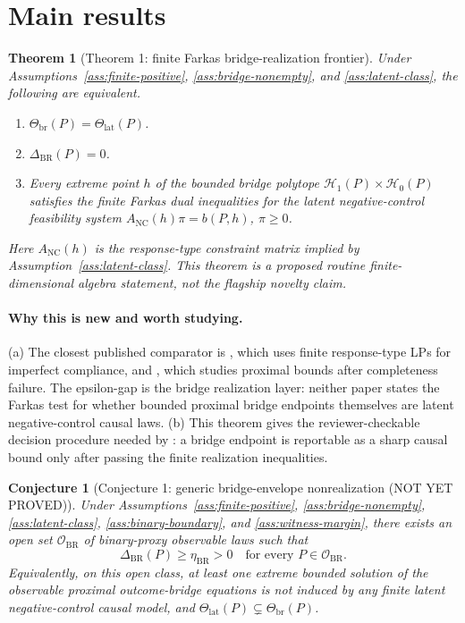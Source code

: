 \documentclass[11pt]{article}
\theoremstyle{definition}
\theoremstyle{plain}
\newtheorem{theorem}{Theorem}
\newtheorem{conjecture}{Conjecture}
\theoremstyle{remark}
\begin{document}
\section{Main results}
\begin{theorem}[Theorem 1: finite Farkas bridge-realization frontier]\label{thm:farkas-frontier}
Under Assumptions~\ref{ass:finite-positive}, \ref{ass:bridge-nonempty}, and
\ref{ass:latent-class}, the following are equivalent.
\begin{enumerate}[label=(\roman*)]
\item \(\Theta_{\mathrm{br}}(P)=\Theta_{\mathrm{lat}}(P)\).
\item \(\Delta_{\mathrm{BR}}(P)=0\).
\item Every extreme point \(h\) of the bounded bridge polytope
\(\mathcal H_1(P)\times\mathcal H_0(P)\) satisfies the finite Farkas dual
inequalities for the latent negative-control feasibility system
\(A_{\mathrm{NC}}(h)\pi=b(P,h)\), \(\pi\ge 0\).
\end{enumerate}
Here \(A_{\mathrm{NC}}(h)\) is the response-type constraint matrix implied by
Assumption~\ref{ass:latent-class}.  This theorem is a proposed routine
finite-dimensional algebra statement, not the flagship novelty claim.
\end{theorem}
\paragraph{Why this is new and worth studying.}
(a) The closest published comparator is \citet{BalkePearl1997}, which uses
finite response-type LPs for imperfect compliance, and
\citet[abstract and Sections 3--4]{GhassamiShpitserTchetgen2023}, which studies
proximal bounds after completeness failure.  The epsilon-gap is the bridge
realization layer: neither paper states the Farkas test for whether bounded
proximal bridge endpoints themselves are latent negative-control causal laws.
(b) This theorem gives the reviewer-checkable decision procedure needed by
\citet{GhassamiShpitserTchetgen2023}: a bridge endpoint is reportable as a
sharp causal bound only after passing the finite realization inequalities.

\begin{conjecture}[Conjecture 1: generic bridge-envelope nonrealization (NOT YET PROVED)]\label{conj:generic-nonrealization}
Under Assumptions~\ref{ass:finite-positive}, \ref{ass:bridge-nonempty},
\ref{ass:latent-class}, \ref{ass:binary-boundary}, and
\ref{ass:witness-margin}, there exists an open set \(\mathcal O_{\mathrm{BR}}\)
of binary-proxy observable laws such that
\[
  \Delta_{\mathrm{BR}}(P)\ge \eta_{\mathrm{BR}}>0
  \quad\text{for every }P\in\mathcal O_{\mathrm{BR}}.
\]
Equivalently, on this open class, at least one extreme bounded solution of the
observable proximal outcome-bridge equations is not induced by any finite
latent negative-control causal model, and
\(\Theta_{\mathrm{lat}}(P)\subsetneq\Theta_{\mathrm{br}}(P)\).
\end{conjecture}
\end{document}
